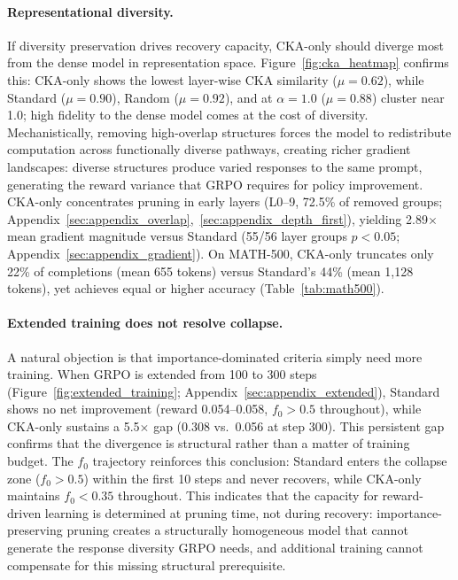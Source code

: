 \paragraph{Representational diversity.}
If diversity preservation drives recovery capacity, CKA-only should diverge most from the dense model in representation space.
Figure~\ref{fig:cka_heatmap} confirms this: CKA-only shows the lowest layer-wise CKA similarity ($\mu{=}0.62$), while Standard ($\mu{=}0.90$), Random ($\mu{=}0.92$), and \rasp{} at $\alpha{=}1.0$ ($\mu{=}0.88$) cluster near 1.0; high fidelity to the dense model comes at the cost of diversity.
Mechanistically, removing high-overlap structures forces the model to redistribute computation across functionally diverse pathways, creating richer gradient landscapes: diverse structures produce varied responses to the same prompt, generating the reward variance that GRPO requires for policy improvement.
CKA-only concentrates pruning in early layers (L0--9, 72.5\% of removed groups; Appendix~\ref{sec:appendix_overlap},~\ref{sec:appendix_depth_first}), yielding 2.89$\times$ mean gradient magnitude versus Standard (55/56 layer groups $p{<}0.05$; Appendix~\ref{sec:appendix_gradient}).
On MATH-500, CKA-only truncates only 22\% of completions (mean 655 tokens) versus Standard's 44\% (mean 1{,}128 tokens), yet achieves equal or higher accuracy (Table~\ref{tab:math500}).

\paragraph{Extended training does not resolve collapse.}
A natural objection is that importance-dominated criteria simply need more training.
When GRPO is extended from 100 to 300 steps (Figure~\ref{fig:extended_training}; Appendix~\ref{sec:appendix_extended}), Standard shows no net improvement (reward 0.054--0.058, $f_0 > 0.5$ throughout), while CKA-only sustains a 5.5$\times$ gap (0.308 vs.\ 0.056 at step 300). This persistent gap confirms that the divergence is structural rather than a matter of training budget.
The $f_0$ trajectory reinforces this conclusion: Standard enters the collapse zone ($f_0 > 0.5$) within the first 10 steps and never recovers, while CKA-only maintains $f_0 < 0.35$ throughout.
This indicates that the capacity for reward-driven learning is determined at pruning time, not during recovery: importance-preserving pruning creates a structurally homogeneous model that cannot generate the response diversity GRPO needs, and additional training cannot compensate for this missing structural prerequisite.

